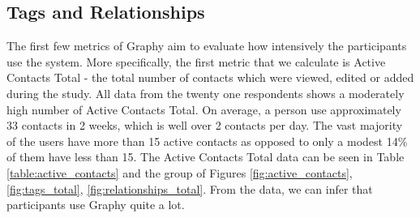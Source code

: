 \subsection{Tags and Relationships}\label{results_tags_relationships}
The first few metrics of Graphy aim to evaluate how intensively the participants use the system. More specifically, the first metric that we calculate is Active Contacts Total - the total number of contacts which were viewed, edited or added during the study. All data from the twenty one respondents shows a moderately high number of Active Contacts Total. On average, a person use approximately 33 contacts in 2 weeks, which is well over 2 contacts per day. The vast majority of the users have more than 15 active contacts as opposed to only a modest 14\% of them have less than 15. The Active Contacts Total data can be seen in Table \ref{table:active_contacts} and the group of Figures \ref{fig:active_contacts}, \ref{fig:tags_total}, \ref{fig:relationships_total}. From the data, we can infer that participants use Graphy quite a lot. 

